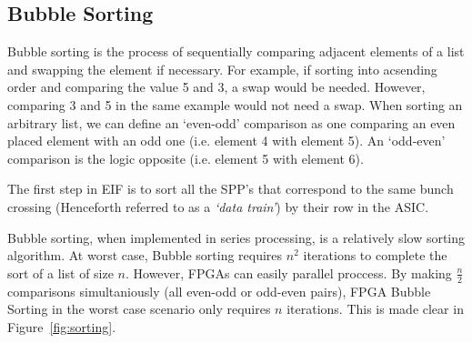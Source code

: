 

	\subsection{Bubble Sorting}

		Bubble sorting is the process of sequentially comparing adjacent elements of a list and swapping the element if necessary.
		For example, if sorting into acsending order and comparing the value 5 and 3, a swap would be needed.
		However, comparing 3 and 5 in the same example would not need a swap.
		When sorting an arbitrary list, we can define an `even-odd' comparison as one comparing an even placed element with an odd one (i.e. element 4 with element 5).
		An `odd-even' comparison is the logic opposite (i.e. element 5 with element 6).
		\par
		The first step in EIF is to sort all the SPP's that correspond to the same bunch crossing (Henceforth referred to as a \textit{`data train'}) by their row in the ASIC.
		\par
		Bubble sorting, when implemented in series processing, is a relatively slow sorting algorithm.
		At worst case, Bubble sorting requires $n^2$ iterations to complete the sort of a list of size $n$.
		However, FPGAs can easily parallel proccess.
		By making $\frac{n}{2}$ comparisons simultaniously (all even-odd or odd-even pairs), FPGA Bubble Sorting in the worst case scenario only requires $n$ iterations. This is made clear in Figure~\ref{fig:sorting}.


